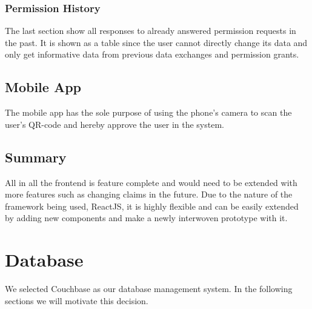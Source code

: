 \subsubsection{Permission History}

The last section show all responses to already answered permission requests in the past. It is shown as a table since the
user cannot directly change its data and only get informative data from previous data exchanges and permission grants.

\subsection{Mobile App}

The mobile app has the sole purpose of using the phone's camera to scan the user's QR-code and hereby approve the user in
the system.

\subsection{Summary}
\label{sec:frontendSummary}

All in all the frontend is feature complete and would need to be extended with more features such as changing claims in
the future. Due to the nature of the framework being used, ReactJS, it is highly flexible and can be easily extended by
adding new components and make a newly interwoven prototype with it.


%

\section{Database}
\label{sec:database}

We selected Couchbase as our database management system. In the following sections we will motivate this decision.

